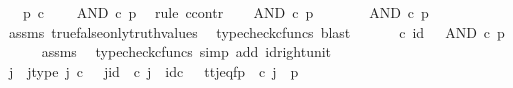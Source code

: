\begin{isabellebody}
\ \ \ {\isachardoublequoteopen}p\ {\isasymin}\isactrlsub c\ {\isasymOmega}{\isachardoublequoteclose}\isanewline
\ \ \ {\isachardoublequoteopen}AND\ {\isasymcirc}\isactrlsub c\ {\isasymlangle}p{\isacharcomma}{\kern0pt}{\isasymf}{\isasymrangle}\ {\isacharequal}{\kern0pt}\ {\isasymf}{\isachardoublequoteclose}\isanewline
%
\isadelimproof
%
\endisadelimproof
%
\isatagproof
{}\isamarkupfalse%
{\isacharparenleft}{\kern0pt}rule\ ccontr{\isacharparenright}{\kern0pt}\isanewline
\ \ \isamarkupfalse%
\ {\isachardoublequoteopen}AND\ {\isasymcirc}\isactrlsub c\ {\isasymlangle}p{\isacharcomma}{\kern0pt}{\isasymf}{\isasymrangle}\ {\isasymnoteq}\ {\isasymf}{\isachardoublequoteclose}\isanewline
\ \ \isamarkupfalse%
\ \isamarkupfalse%
\ {\isachardoublequoteopen}AND\ {\isasymcirc}\isactrlsub c\ {\isasymlangle}p{\isacharcomma}{\kern0pt}{\isasymf}{\isasymrangle}\ {\isacharequal}{\kern0pt}\ {\isasymt}{\isachardoublequoteclose}\isanewline
\ \ \ \ \isamarkupfalse%
\ assms\ true{\isacharunderscore}{\kern0pt}false{\isacharunderscore}{\kern0pt}only{\isacharunderscore}{\kern0pt}truth{\isacharunderscore}{\kern0pt}values\ \isamarkupfalse%
\ {\isacharparenleft}{\kern0pt}typecheck{\isacharunderscore}{\kern0pt}cfuncs{\isacharcomma}{\kern0pt}\ blast{\isacharparenright}{\kern0pt}\isanewline
\ \ \isamarkupfalse%
\ \isamarkupfalse%
\ {\isachardoublequoteopen}{\isasymt}\ {\isasymcirc}\isactrlsub c\ id\ {\isasymone}\ {\isacharequal}{\kern0pt}\ AND\ {\isasymcirc}\isactrlsub c\ {\isasymlangle}p{\isacharcomma}{\kern0pt}{\isasymf}{\isasymrangle}{\isachardoublequoteclose}\isanewline
\ \ \ \ \isamarkupfalse%
\ assms\ \isamarkupfalse%
\ {\isacharparenleft}{\kern0pt}typecheck{\isacharunderscore}{\kern0pt}cfuncs{\isacharcomma}{\kern0pt}\ simp\ add{\isacharcolon}{\kern0pt}\ id{\isacharunderscore}{\kern0pt}right{\isacharunderscore}{\kern0pt}unit{}{\isacharparenright}{\kern0pt}\isanewline
\ \ \isamarkupfalse%
\ \isamarkupfalse%
\ j\ \ j{\isacharunderscore}{\kern0pt}type{\isacharcolon}{\kern0pt}\ {\isachardoublequoteopen}j\ {\isasymin}\isactrlsub c\ {\isasymone}{\isachardoublequoteclose}\ \ j{\isacharunderscore}{\kern0pt}id{\isacharcolon}{\kern0pt}\ {\isachardoublequoteopen}{\isasymbeta}\isactrlbsub {\isasymone}\isactrlesub \ {\isasymcirc}\isactrlsub c\ j\ {\isacharequal}{\kern0pt}\ id\isactrlsub c\ {\isasymone}{\isachardoublequoteclose}\ \ tt{\isacharunderscore}{\kern0pt}j{\isacharunderscore}{\kern0pt}eq{\isacharunderscore}{\kern0pt}fp{\isacharcolon}{\kern0pt}\ {\isachardoublequoteopen}{\isasymlangle}{\isasymt}{\isacharcomma}{\kern0pt}{\isasymt}{\isasymrangle}\ {\isasymcirc}\isactrlsub c\ j\ {\isacharequal}{\kern0pt}\ {\isasymlangle}p{\isacharcomma}{\kern0pt}{\isasymf}{\isasymrangle}{\isachardoublequoteclose}\isanewline

\end{isabellebody}
